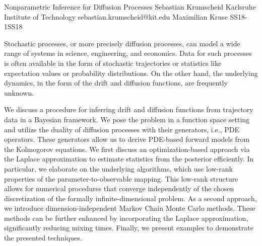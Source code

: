 \begin{talk}
  {Nonparametric Inference for Diffusion Processes}%
  {Sebastian Krumscheid}%
  {Karlsruhe Institute of Technology}%
  {sebastian.krumscheid@kit.edu}%
  {Maximilian Kruse}%
{}{}{SS18-1}{SS18}


Stochastic processes, or more precisely diffusion processes, can model a wide range of systems in science, engineering, and economics. Data for such processes is often available in the form of stochastic trajectories or statistics like expectation values or probability distributions. On the other hand, the underlying dynamics, in the form of the drift and diffusion functions, are frequently unknown.

We discuss a procedure for inferring drift and diffusion functions from trajectory data in a Bayesian framework. We pose the problem in a function space setting and utilize the duality of diffusion processes with their generators, i.e., PDE operators. These generators allow us to derive PDE-based forward models from the Kolmogorov equations. We first discuss an optimization-based approach via the Laplace approximation to estimate statistics from the posterior efficiently. In particular, we elaborate on the underlying algorithms, which use low-rank properties of the parameter-to-observable mapping. This low-rank structure allows for numerical procedures that converge independently of the chosen discretization of the formally infinite-dimensional problem. As a second approach, we introduce dimension-independent Markov Chain Monte Carlo methods. These methods can be further enhanced by incorporating the Laplace approximation, significantly reducing mixing times. Finally, we present examples to demonstrate the presented techniques.

\end{talk}

